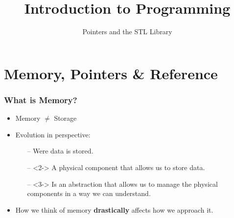 \documentclass{beamer}
\begin{document}
\newcommand{\tabitem}{~~\llap{\textbullet}~~}


\title{Introduction to Programming}
\subtitle{Pointers and the STL Library}

\maketitle

\section{Memory, Pointers \& Reference}

\begin{frame}
    \frametitle{What is Memory?}

    \begin{itemize}
        \item Memory $\neq$ Storage
        \item Evolution in perspective:
            \begin{itemize}
                \item[--] Were data is stored.
                \item[--]<2-> A physical component that allows us to store data.
                \item[--]<3-> Is an abstraction that allows us to manage the physical components in a way we can understand.
            \end{itemize}
        \item How we think of memory \textbf{drastically} affects how we approach it.
    \end{itemize}

\end{frame}
\end{document}
